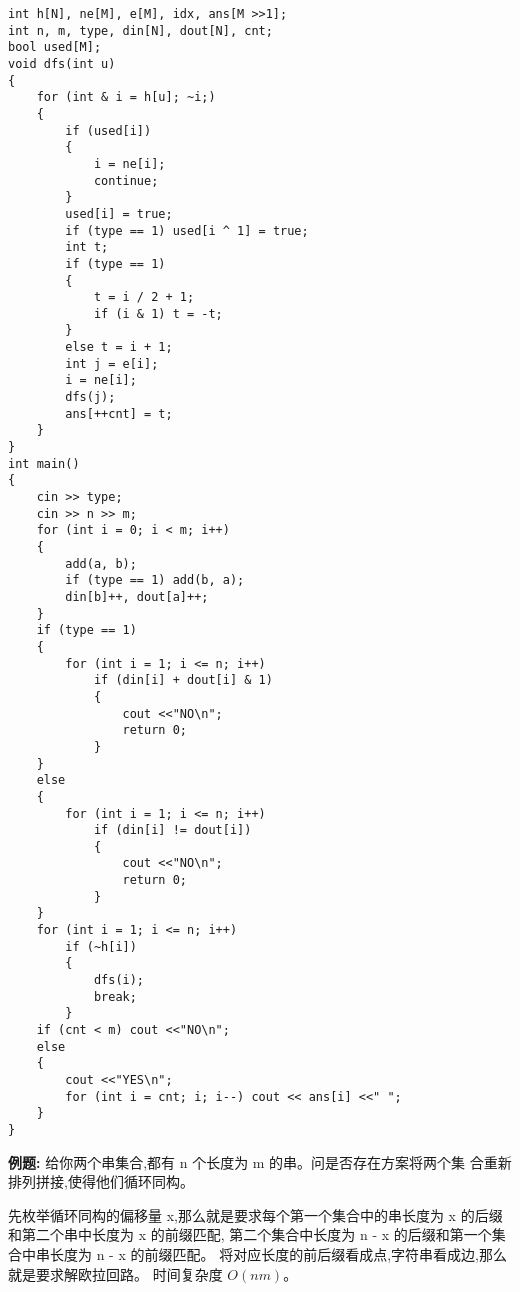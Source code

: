 \documentclass[a4paper, fontset=none]{ctexart}
\begin{document}
\begin{verbatim}
int h[N], ne[M], e[M], idx, ans[M >>1];
int n, m, type, din[N], dout[N], cnt;
bool used[M];
void dfs(int u)
{
    for (int & i = h[u]; ~i;)
    {
        if (used[i])
        {
            i = ne[i];
            continue;
        }
        used[i] = true;
        if (type == 1) used[i ^ 1] = true;
        int t;
        if (type == 1)
        {
            t = i / 2 + 1;
            if (i & 1) t = -t;
        }
        else t = i + 1;
        int j = e[i];
        i = ne[i];
        dfs(j);
        ans[++cnt] = t;
    }
}
int main()
{
    cin >> type;
    cin >> n >> m;
    for (int i = 0; i < m; i++)
    {
        add(a, b);
        if (type == 1) add(b, a);
        din[b]++, dout[a]++;
    }
    if (type == 1)
    {
        for (int i = 1; i <= n; i++)
            if (din[i] + dout[i] & 1)
            {
                cout <<"NO\n";
                return 0;
            }
    }
    else
    {
        for (int i = 1; i <= n; i++)
            if (din[i] != dout[i])
            {
                cout <<"NO\n";
                return 0;
            }
    }
    for (int i = 1; i <= n; i++)
        if (~h[i])
        {
            dfs(i);
            break;
        }
    if (cnt < m) cout <<"NO\n";
    else
    {
        cout <<"YES\n";
        for (int i = cnt; i; i--) cout << ans[i] <<" ";
    }
}
\end{verbatim}

\textbf{例题:} 给你两个串集合,都有 n 个长度为 m 的串。问是否存在方案将两个集
合重新排列拼接,使得他们循环同构。

先枚举循环同构的偏移量 x,那么就是要求每个第一个集合中的串长度为 x 的后缀和第二个串中长度为 x 的前缀匹配,
第二个集合中长度为 n - x 的后缀和第一个集合中串长度为 n - x 的前缀匹配。
将对应长度的前后缀看成点,字符串看成边,那么就是要求解欧拉回路。
时间复杂度 $O(nm)$。
\end{document}
